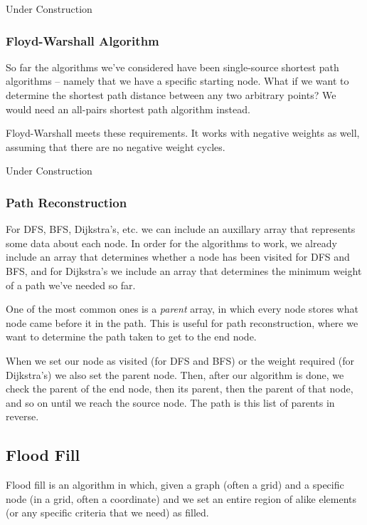 Under Construction

\subsubsection{Floyd-Warshall Algorithm}

So far the algorithms we've considered have been single-source shortest path algorithms -- namely that we have a specific starting node. What if we want to determine the shortest path distance between any two arbitrary points? We would need an all-pairs shortest path algorithm instead.

Floyd-Warshall meets these requirements. It works with negative weights as well, assuming that there are no negative weight cycles.

Under Construction

\subsubsection{Path Reconstruction}

For DFS, BFS, Dijkstra's, etc. we can include an auxillary array that represents some data about each node. In order for the algorithms to work, we already include an array that determines whether a node has been visited for DFS and BFS, and for Dijkstra's we include an array that determines the minimum weight of a path we've needed so far.

One of the most common ones is a \textit{parent} array, in which every node stores what node came before it in the path. This is useful for path reconstruction, where we want to determine the path taken to get to the end node.

When we set our node as visited (for DFS and BFS) or the weight required (for Dijkstra's) we also set the parent node. Then, after our algorithm is done, we check the parent of the end node, then its parent, then the parent of that node, and so on until we reach the source node. The path is this list of parents in reverse.

\subsection{Flood Fill}

Flood fill is an algorithm in which, given a graph (often a grid) and a specific node (in a grid, often a coordinate) and we set an entire region of alike elements (or any specific criteria that we need) as filled.


